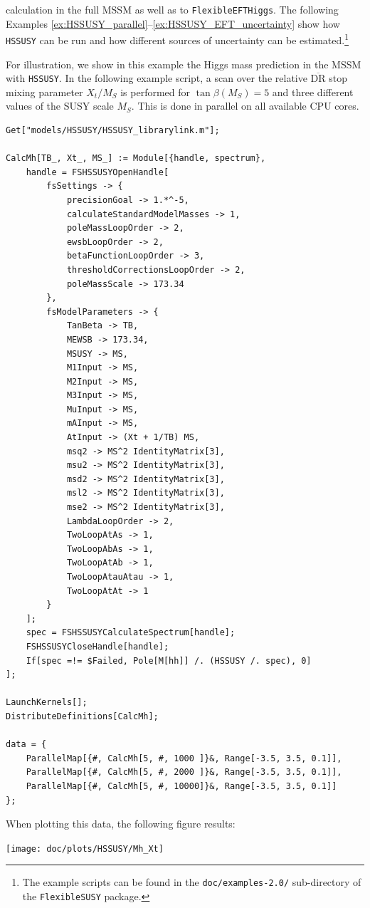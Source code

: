 \documentclass[final,3p,11pt,pdflatex]{elsarticle}
\makeatletter
\newcommand{\modelname}[1]{\texttt{#1}\@\xspace}
\newcommand{\fs}{\texttt{FlexibleSUSY}\@\xspace}
\newcommand{\HSSUSY}{\modelname{HSSUSY}}
\newcommand{\feft}{\texttt{Flex\-ib\-le\-EFT\-Higgs}\@\xspace}
\newcommand{\code}[1]{\lstinline|#1|}  %
\newcommand{\ol}[1]{\overline{#1}}
\newcommand{\DRbar}{\ensuremath{\ol{\text{DR}}}\xspace}
\newcommand{\MS}{\ensuremath{M_S}\xspace}
\makeatother
\begin{document}
calculation in the full MSSM as well as to \feft.  The following
Examples \ref{ex:HSSUSY_parallel}--\ref{ex:HSSUSY_EFT_uncertainty}
show how \HSSUSY can be run and how different sources of uncertainty
can be estimated.\footnote{The example scripts can be found in the
  \code{doc/examples-2.0/} sub-directory of the \fs package.}
%
\begin{example}[label=ex:HSSUSY_parallel]
  For illustration, we show in this example the Higgs mass prediction
  in the MSSM with \HSSUSY.  In the following example script, a scan
  over the relative \DRbar stop mixing parameter $X_t/\MS$ is performed for
  $\tan\beta(\MS) = 5$ and three different values of the SUSY scale $\MS$.
  This is done in parallel on all available CPU cores.
\begin{lstlisting}
Get["models/HSSUSY/HSSUSY_librarylink.m"];

CalcMh[TB_, Xt_, MS_] := Module[{handle, spectrum},
    handle = FSHSSUSYOpenHandle[
        fsSettings -> {
            precisionGoal -> 1.*^-5,
            calculateStandardModelMasses -> 1,
            poleMassLoopOrder -> 2,
            ewsbLoopOrder -> 2,
            betaFunctionLoopOrder -> 3,
            thresholdCorrectionsLoopOrder -> 2,
            poleMassScale -> 173.34
        },
        fsModelParameters -> {
            TanBeta -> TB,
            MEWSB -> 173.34,
            MSUSY -> MS,
            M1Input -> MS,
            M2Input -> MS,
            M3Input -> MS,
            MuInput -> MS,
            mAInput -> MS,
            AtInput -> (Xt + 1/TB) MS,
            msq2 -> MS^2 IdentityMatrix[3],
            msu2 -> MS^2 IdentityMatrix[3],
            msd2 -> MS^2 IdentityMatrix[3],
            msl2 -> MS^2 IdentityMatrix[3],
            mse2 -> MS^2 IdentityMatrix[3],
            LambdaLoopOrder -> 2,
            TwoLoopAtAs -> 1,
            TwoLoopAbAs -> 1,
            TwoLoopAtAb -> 1,
            TwoLoopAtauAtau -> 1,
            TwoLoopAtAt -> 1
        }
    ];
    spec = FSHSSUSYCalculateSpectrum[handle];
    FSHSSUSYCloseHandle[handle];
    If[spec =!= $Failed, Pole[M[hh]] /. (HSSUSY /. spec), 0]
];

LaunchKernels[];
DistributeDefinitions[CalcMh];

data = {
    ParallelMap[{#, CalcMh[5, #, 1000 ]}&, Range[-3.5, 3.5, 0.1]],
    ParallelMap[{#, CalcMh[5, #, 2000 ]}&, Range[-3.5, 3.5, 0.1]],
    ParallelMap[{#, CalcMh[5, #, 10000]}&, Range[-3.5, 3.5, 0.1]]
};
\end{lstlisting}%
%
When plotting this data, the following figure results:
%
\begin{center}
  \texttt{[image: doc/plots/HSSUSY/Mh\_Xt]}
\end{center}
\end{example}
\end{document}

